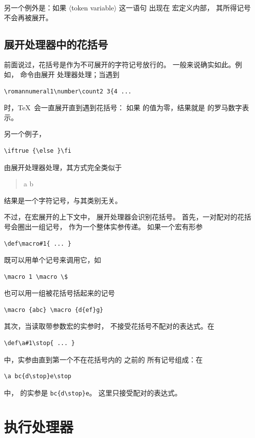 \documentclass[a4paper]{rapport3}
\def\gr#1{$\langle$#1$\rangle$}\def\key#1{{\tt#1}}
\newenvironment{disp}{\begin{quotation}}{\end{quotation}}
\begin{document}
另一个例外是：如果 \gr{token variable} 这一语句
出现在  宏定义内部，
其所得记号不会再被展开。

\subsection{展开处理器中的花括号}

前面说过，花括号是作为不可展开的字符记号放行的。
一般来说确实如此。例如， 命令由展开
处理器处理；当遇到
\begin{verbatim}
\romannumeral1\number\count2 3{4 ...
\end{verbatim}
时，\TeX\ 会一直展开直到遇到花括号：
如果  的值为零，结果就是  的罗马数字表示。

另一个例子，\begin{verbatim}
\iftrue {\else }\fi
\end{verbatim}
由展开处理器处理，其方式完全类似于
\begin{disp} {\italic a} {\italic b}\end{disp}
\awp
结果是一个字符记号，与其类别无关。

不过，在宏展开的上下文中，
展开处理器会识别花括号。
首先，一对配对的花括号会圈出一组记号，
作为一个整体实参传递。
如果一个宏有形参 \begin{verbatim}
\def\macro#1{ ... }
\end{verbatim}
既可以用单个记号来调用它，如
\begin{verbatim}
\macro 1 \macro \$
\end{verbatim}
也可以用一组被花括号括起来的记号
\begin{verbatim}
\macro {abc} \macro {d{ef}g}
\end{verbatim}


其次，当读取带参数宏的实参时，
不接受花括号不配对的表达式。在
\begin{verbatim}
\def\a#1\stop{ ... }
\end{verbatim}
中，实参由直到第一个不在花括号内的  之前的
所有记号组成：在
\begin{verbatim}
\a bc{d\stop}e\stop
\end{verbatim}
中， 的实参是 \verb>bc{d\stop}e>。
这里只接受配对的表达式。

\section{执行处理器}
\end{document}
